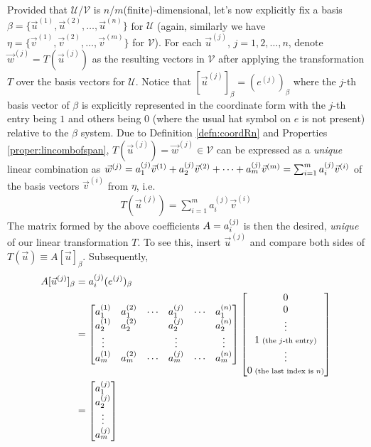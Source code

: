 Provided that $\mathcal{U}$/$\mathcal{V}$ is $n$/$m$(finite)-dimensional, let's now explicitly fix a basis $\mathcal{\beta} = \{\vec{u}^{(1)}, \vec{u}^{(2)}, \ldots, \vec{u}^{(n)}\}$ for $\mathcal{U}$ (again, similarly we have $\mathcal{\eta} = \{\vec{v}^{(1)}, \vec{v}^{(2)}, \ldots, \allowbreak \vec{v}^{(m)}\}$ for $\mathcal{V}$). For each $\vec{u}^{(j)}$, $j = 1,2,\ldots,n$, denote $\vec{w}^{(j)} = T(\vec{u}^{(j)})$ as the resulting vectors in $\mathcal{V}$ after applying the transformation $T$ over the basis vectors for $\mathcal{U}$. Notice that $[\vec{u}^{(j)}]_\beta = (e^{(j)})_\beta$ where the $j$-th basis vector of $\mathcal{\beta}$ is explicitly represented in the coordinate form with the $j$-th entry being $1$ and others being $0$ (where the usual hat symbol on $e$ is not present) relative to the $\mathcal{\beta}$ system. Due to Definition \ref{defn:coordRn} and Properties \ref{proper:lincombofspan}, $T(\vec{u}^{(j)}) = \vec{w}^{(j)} \in \mathcal{V}$ can be expressed as a \textit{unique} linear combination as $\vec{w}^{(j)} = \smash{a_1^{(j)}}\vec{v}^{(1)} + \smash{a_2^{(j)}}\vec{v}^{(2)} + \cdots + \smash{a_m^{(j)}}\vec{v}^{(m)} = \sum_{i=1}^{m} \smash{a_i^{(j)}}\vec{v}^{(i)}$ of the basis vectors $\vec{v}^{(i)}$ from $\mathcal{\eta}$, i.e.
\begin{align}
T(\vec{u}^{(j)}) = \sum_{i=1}^{m} a_i^{(j)}\vec{v}^{(i)}
\end{align}
The matrix formed by the above coefficients $A = \smash{a_i^{(j)}}$ is then the desired, \textit{unique}  of our linear transformation $T$. To see this, insert $\vec{u}^{(j)}$ and compare both sides of $T(\vec{u}) \equiv A[\vec{u}]_\beta$. Subsequently,
\begin{align*}
A[\vec{u}^{(j)}]_\beta &= a_i^{(j)}(e^{(j)})_\beta \\
&=
\begin{bmatrix}
a_1^{(1)} & a_1^{(2)} & \cdots & a_1^{(j)} & \cdots & a_1^{(n)} \\
a_2^{(1)} & a_2^{(2)} & & a_2^{(j)} & & a_2^{(n)} \\
\vdots & & & \vdots & & \vdots \\
a_m^{(1)} & a_m^{(2)} & \cdots & a_m^{(j)} & \cdots & a_m^{(n)}
\end{bmatrix}
\begin{bmatrix}
0 \\
0 \\
\vdots \\
1 {\scriptsize \text{ (the $j$-th entry)}} \\
\vdots \\
0 {\scriptsize \text{ (the last index is $n$)}}
\end{bmatrix} \\
&=
\begin{bmatrix}
a_1^{(j)} \\
a_2^{(j)} \\
\vdots \\
a_m^{(j)}
\end{bmatrix}
\end{align*}
